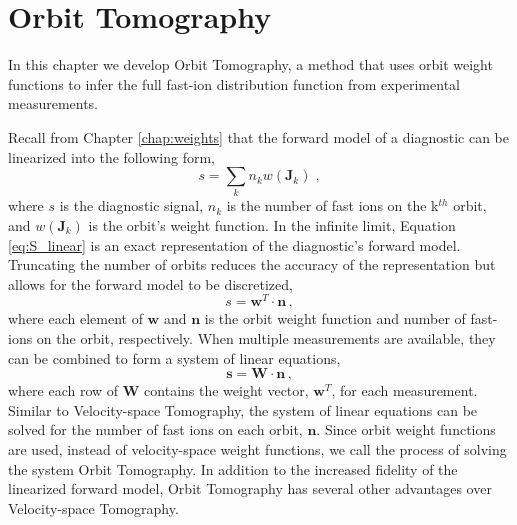 \chapter{Orbit Tomography}\label{chap:orbit_tomography}

In this chapter we develop Orbit Tomography, a method that uses orbit weight functions to infer the full fast-ion distribution function from experimental measurements.

Recall from Chapter \ref{chap:weights} that the forward model of a diagnostic can be linearized into the following form,
\begin{equation}\label{eq:S_linear}
    s = \sum_k n_k w(\mathbf{J}_k) \;,
\end{equation}
where $s$ is the diagnostic signal, $n_k$ is the number of fast ions on the k$^{th}$ orbit, and $w(\mathbf{J}_k)$ is the orbit's weight function.
In the infinite limit, Equation \ref{eq:S_linear} is an exact representation of the diagnostic's forward model. Truncating the number of orbits reduces the accuracy of the representation but allows for the forward model to be discretized,
\begin{equation}
    s = \mathbf{w}^T\cdot\mathbf{n}\,,
\end{equation}
where each element of $\mathbf{w}$ and $\mathbf{n}$ is the orbit weight function and number of fast-ions on the orbit, respectively. When multiple measurements are available, they can be combined to form a system of linear equations,
\begin{equation}\label{eq:Wxn}
    \mathbf{s} = \mathbf{W}\cdot\mathbf{n}\,,
\end{equation}
where each row of $\mathbf{W}$ contains the weight vector, $\mathbf{w}^T$, for each measurement. Similar to Velocity-space Tomography, the system of linear equations can be solved for the number of fast ions on each orbit, $\mathbf{n}$. Since orbit weight functions are used, instead of velocity-space weight functions, we call the process of solving the system Orbit Tomography.
In addition to the increased fidelity of the linearized forward model, Orbit Tomography has several other advantages over Velocity-space Tomography.

